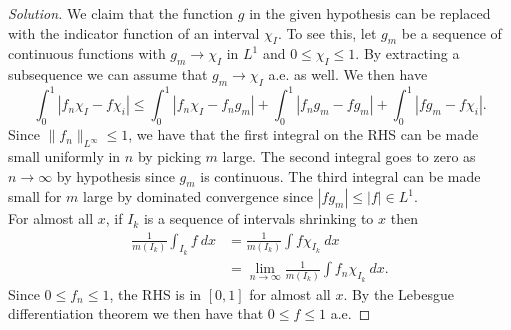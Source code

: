 \documentclass[11pt,letterpaper]{report}
\newenvironment{solution}
{\begin{proof}[Solution]}
{\end{proof}}
\begin{document}
\begin{enumerate}
\begin{solution}
		\noindent We claim that the function $g$ in the given hypothesis can be replaced with the indicator function of an interval $\chi_I$. To see this, let $g_m$ be a sequence of continuous functions with $g_m\to \chi_I$ in $L^1$ and $0\leq \chi_I\leq 1$. By extracting a subsequence we can assume that $g_m\to \chi_I$ a.e. as well. We then have
		\[
		\int_0^1|f_n\chi_I - f\chi_i| \leq \int_0^1|f_n\chi_I-f_ng_m| + \int_0^1|f_ng_m-fg_m| + \int_0^1|fg_m-f\chi_i|.
		\]
		Since $\|f_n\|_{L^\infty}\leq 1$, we have that the first integral on the RHS can be made small uniformly in $n$ by picking $m$ large. The second integral goes to zero as $n\to \infty$ by hypothesis since $g_m$ is continuous. The third integral can be made small for $m$ large by dominated convergence since $|fg_m| \leq |f|\in L^1$.\\

		For almost all $x$, if $I_k$ is a sequence of intervals shrinking to $x$ then
		\begin{align*}
		\frac{1}{m(I_k)}\int_{I_k}f\ dx &= \frac{1}{m(I_k)}\int f\chi_{I_k}\ dx\\
		&= \lim_{n\to \infty}\frac{1}{m(I_k)}\int f_n\chi_{I_k}\ dx.
		\end{align*}
		Since $0\leq f_n\leq 1$, the RHS is in $[0, 1]$ for almost all $x$. By the Lebesgue differentiation theorem we then have that $0\leq f\leq 1$ a.e.
	\end{solution}


\end{enumerate}
\end{document}
